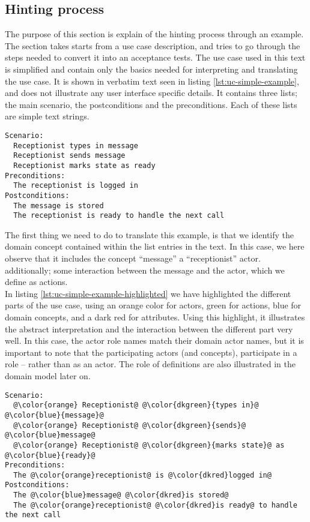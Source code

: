 \subsection{Hinting process}
The purpose of this section is explain of the hinting process through an example. The section takes starts from a use case description, and tries to go through the steps needed to convert it into an acceptance tests. The use case used in this text is simplified and contain only the basics needed for interpreting and translating the use case. It is shown in verbatim text seen in listing \ref{lst:uc-simple-example}, and does not illustrate any user interface specific details. It contains three lists; the main scenario, the postconditions and the preconditions. Each of these lists are simple text strings.

\begin{lstlisting}[frame=single,style=usecase, caption=Use case example, label=lst:uc-simple-example]
Scenario:
  Receptionist types in message
  Receptionist sends message
  Receptionist marks state as ready 
Preconditions:
  The receptionist is logged in
Postconditions:
  The message is stored
  The receptionist is ready to handle the next call
\end{lstlisting}
The first thing we need to do to translate this example, is that we identify the domain concept contained within the list entries in the text. In this case, we here observe that it includes the concept ``message'' a ``receptionist'' actor. additionally; some interaction between the message and the actor, which we define as actions.\\
In listing \ref{lst:uc-simple-example-highlighted} we have highlighted the different parts of the use case, using an orange color for actors, green for actions, blue for domain concepts, and a dark red for attributes. Using this highlight, it illustrates the abstract interpretation and the interaction between the different part very well. In this case, the actor role names match their domain actor names, but it is important to note that the participating actors (and concepts), participate in a role -- rather than as an actor. The role of definitions are also illustrated in the domain model later on.
\begin{lstlisting}[frame=single,style=usecase, caption=Use case example with its different parts highlighted, label=lst:uc-simple-example-highlighted]
Scenario:
  @\color{orange} Receptionist@ @\color{dkgreen}{types in}@ @\color{blue}{message}@
  @\color{orange} Receptionist@ @\color{dkgreen}{sends}@ @\color{blue}message@
  @\color{orange} Receptionist@ @\color{dkgreen}{marks state}@ as @\color{blue}{ready}@
Preconditions:
  The @\color{orange}receptionist@ is @\color{dkred}logged in@
Postconditions:
  The @\color{blue}message@ @\color{dkred}is stored@
  The @\color{orange}receptionist@ @\color{dkred}is ready@ to handle the next call
\end{lstlisting} 
